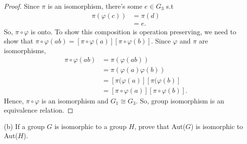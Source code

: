 \documentclass[12pt, letterpaper]{article}
\begin{document}
\begin{proof}
    Since $\pi$ is an isomorphism, there's some $e \in G_3$ s.t
    \begin{align*}
         \pi(\varphi(c)) &= \pi(d) \\
          &= e.
    \end{align*}
    So, $\pi \circ \varphi$ is onto. To show this composition is operation preserving, we need to show that $\pi \circ \varphi(ab) = [\pi \circ \varphi(a)][\pi \circ \varphi(b)]$. Since $\varphi$ and $\pi$ are isomorphisms,
    \begin{align*}
        \pi \circ \varphi(ab) &=\pi(\varphi(ab)) \\
        &=  \pi(\varphi(a)\varphi(b)) \\
        &= [\pi(\varphi(a)][\pi(\varphi(b)] \\
        &= [\pi \circ \varphi (a)][\pi \circ \varphi (b)].
    \end{align*}
    Hence, $\pi \circ \varphi$ is an isomorphism and $G_1 \cong G_3$.
    So, group isomorphism is an equivalence relation. 
\end{proof} 
\quad (b) If a group $G$ is isomorphic to a group $H$, prove that Aut($G$) is isomorphic to Aut($H$).
\end{document}
